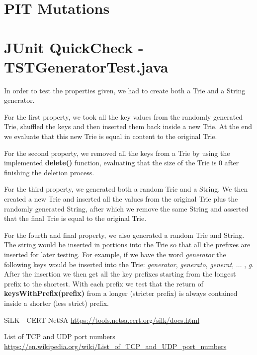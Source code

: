 \documentclass[12pt]{article}
\begin{document}
\section{PIT Mutations}

\section[JUnit QuickCheck - TSTGeneratorTest.java]{JUnit QuickCheck - \\TSTGeneratorTest.java}
In order to test the properties given, we had to create both a Trie and a String generator.

For the first property, we took all the key values from the randomly generated Trie, shuffled the keys and then inserted them back inside a new Trie. At the end we evaluate that this new Trie is equal in content to the original Trie.

For the second property, we removed all the keys from a Trie by using the implemented \textbf{delete()} function, evaluating that the size of the Trie is 0 after finishing the deletion process.

For the third property, we generated both a random Trie and a String. We then created a new Trie and inserted all the values from the original Trie plus the randomly generated String, after which we remove the same String and asserted that the final Trie is equal to the original Trie.

For the fourth and final property, we also generated a random Trie and String. The string would be inserted in portions into the Trie so that all the prefixes are inserted for later testing. For example, if we have the word \textit{generator} the following keys would be inserted into the Trie: \textit{generator}, \textit{generato}, \textit{generat}, ... , \textit{g}. After the insertion we then get all the key prefixes starting from the longest prefix to the shortest. With each prefix we test that the return of \textbf{keysWithPrefix(prefix)} from a longer (stricter prefix) is always contained inside a shorter (less strict) prefix.

\begin{thebibliography}{9}
SiLK - CERT NetSA
\url{https://tools.netsa.cert.org/silk/docs.html}

List of TCP and UDP port numbers
\url{https://en.wikipedia.org/wiki/List_of_TCP_and_UDP_port_numbers}



\end{thebibliography}



\end{document}
